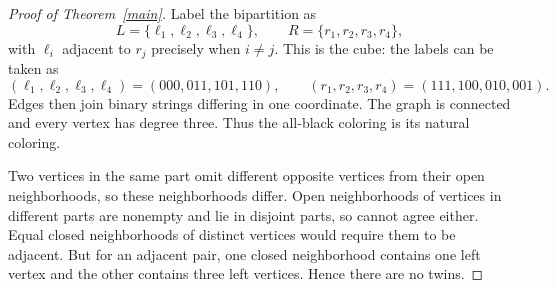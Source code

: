 \documentclass[11pt]{article}
\begin{document}
\begin{proof}[Proof of Theorem~\ref{main}]
Label the bipartition as
\[
 L=\{\ell_1,\ell_2,\ell_3,\ell_4\},\qquad
 R=\{r_1,r_2,r_3,r_4\},
\]
with \(\ell_i\) adjacent to \(r_j\) precisely when \(i\ne j\).
This is the cube: the labels can be taken as
\[
 (\ell_1,\ell_2,\ell_3,\ell_4)=(000,011,101,110),\qquad
 (r_1,r_2,r_3,r_4)=(111,100,010,001).
\]
Edges then join binary strings differing in one coordinate.
The graph is connected and every vertex has degree three.
Thus the all-black coloring is its natural coloring.

Two vertices in the same part omit different opposite vertices from
their open neighborhoods, so these neighborhoods differ. Open
neighborhoods of vertices in different parts are nonempty and lie
in disjoint parts, so cannot agree either. Equal closed neighborhoods
of distinct vertices would require them to be adjacent. But for
an adjacent pair, one closed neighborhood contains one left vertex
and the other contains three left vertices. Hence there are no twins.


\end{proof}
\end{document}
